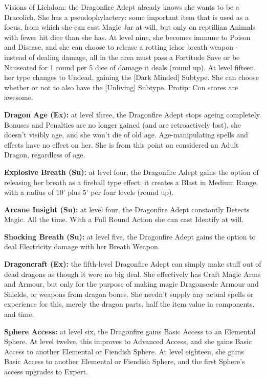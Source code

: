 \begin{itemize*}
\item Visions of Lichdom: the Dragonfire Adept already knows she wants to be a Dracolich. She has a pseudophylactery: some important item that is used as a focus, from which she can cast Magic Jar at will, but only on reptillian Animals with fewer hit dice than she has. At level nine, she becomes immune to Poison and Disease, and she can choose to release a rotting ichor breath weapon - instead of dealing damage, all in the area must pass a Fortitude Save or be Nauseated for 1 round per 5 dice of damage it deals (round up). At level fifteen, her type changes to Undead, gaining the [Dark Minded] Subtype. She can choose whether or not to also have the [Unliving] Subtype. Protip: Con scores are awesome.
\end{itemize*}

\textbf{Dragon Age (Ex):} at level three, the Dragonfire Adept stops ageing completely. Bonuses and Penalties are no longer gained (and are retroactively lost), she doesn't visibly age, and she won't die of old age. Age-manipulating spells and effects have no effect on her. She is from this point on considered an Adult Dragon, regardless of age. 

\textbf{Explosive Breath (Su):} at level four, the Dragonfire Adept gains the option of releasing her breath as a fireball type effect: it creates a Blast in Medium Range, with a radius of 10' plus 5' per four levels (round up). 

\textbf{Arcane Insight (Su):} at level four, the Dragonfire Adept constantly Detects Magic. All the time. With a Full Round Action she can cast Identify at will. 

\textbf{Shocking Breath (Su):} at level five, the Dragonfire Adept gains the option to deal Electricity damage with her Breath Weapon. 

\textbf{Dragoncraft (Ex):} the fifth-level Dragonfire Adept can simply make stuff out of dead dragons as though it were no big deal. She effectively has Craft Magic Arms and Armour, but only for the purpose of making magic Dragonscale Armour and Shields, or weapons from dragon bones. She needn't supply any actual spells or experience for this, merely the dragon parts, half the item value in components, and time. 

\textbf{Sphere Access:} at level six, the Dragonfire gains Basic Access to an Elemental Sphere. At level twelve, this improves to Advanced Access, and she gains Basic Access to another Elemental or Fiendish Sphere. At level eighteen, she gains Basic Access to another Elemental or Fiendish Sphere, and the first Sphere's access upgrades to Expert. 


